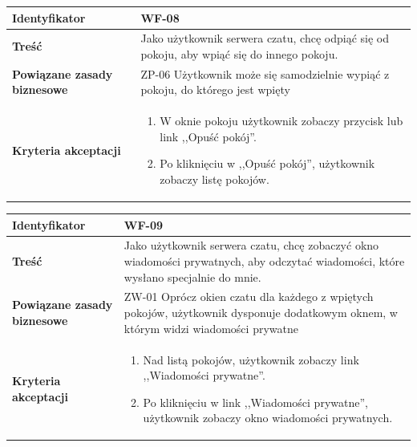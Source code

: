 \documentclass[11pt,oneside,a4paper,titlepage,onecolumn]{article}
\newenvironment{enumreq}
{ \begin{enumerate}[topsep=0pt,itemsep=-1ex,partopsep=1ex,parsep=1ex] }
{ \end{enumerate}                  }
\begin{document}
\vspace{2em} 

\begin{tabular}{ | l | l | }
	\hline
		\textbf{Identyfikator} & 
		WF-08
		\\
		
	\hline
		\textbf{Treść} & \parbox[t]{11cm}{
			Jako użytkownik serwera czatu, chcę odpiąć się od pokoju,
			aby wpiąć się do innego pokoju.
		}\\
		 
	\hline
		\parbox[t]{4cm}{\textbf{Powiązane zasady biznesowe}} & \parbox[t]{11cm}{
			ZP-06 Użytkownik może się samodzielnie wypiąć z pokoju,
			do którego jest wpięty
			
		}\\
		
	\hline
		\parbox[t]{4cm}{\textbf{Kryteria akceptacji}} & \parbox[t]{11cm}{
			\begin{enumreq}
				\item W oknie pokoju użytkownik zobaczy przycisk
				lub link ,,Opuść pokój''.
				\item Po kliknięciu w ,,Opuść pokój'', użytkownik
				zobaczy listę pokojów.
			\end{enumreq}
			}
		\\

	\hline
\end{tabular}

\vspace{2em} 

\begin{tabular}{ | l | l | }
	\hline
		\textbf{Identyfikator} & 
		WF-09
		\\
		
	\hline
		\textbf{Treść} & \parbox[t]{11cm}{
			Jako użytkownik serwera czatu, chcę zobaczyć
			okno wiadomości prywatnych, aby odczytać wiadomości,
			które wysłano specjalnie do mnie.
		}\\
		 
	\hline
		\parbox[t]{4cm}{\textbf{Powiązane zasady biznesowe}} & \parbox[t]{11cm}{
			ZW-01 Oprócz okien czatu dla każdego z wpiętych pokojów,
			użytkownik dysponuje dodatkowym oknem, w którym widzi
			wiadomości prywatne
		}\\
		
	\hline
		\parbox[t]{4cm}{\textbf{Kryteria akceptacji}} & \parbox[t]{11cm}{
			\begin{enumreq}
				\item Nad listą pokojów, użytkownik zobaczy link
				,,Wiadomości prywatne''.
				\item Po kliknięciu w link ,,Wiadomości prywatne'',
				użytkownik zobaczy okno wiadomości prywatnych.
			\end{enumreq}
			}
		\\

	\hline
\end{tabular}
\end{document}
